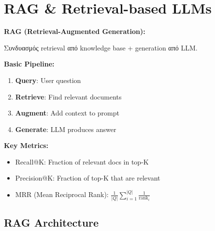 
\chapter{RAG \& Retrieval-based LLMs}

\begin{formulabox}
\textbf{RAG (Retrieval-Augmented Generation):}

Συνδυασμός retrieval από knowledge base + generation από LLM.

\textbf{Basic Pipeline:}
\begin{enumerate}
    \item \textbf{Query}: User question
    \item \textbf{Retrieve}: Find relevant documents
    \item \textbf{Augment}: Add context to prompt
    \item \textbf{Generate}: LLM produces answer
\end{enumerate}

\textbf{Key Metrics:}
\begin{itemize}
    \item Recall@K: Fraction of relevant docs in top-K
    \item Precision@K: Fraction of top-K that are relevant
    \item MRR (Mean Reciprocal Rank): $\frac{1}{|Q|}\sum_{i=1}^{|Q|} \frac{1}{\text{rank}_i}$
\end{itemize}
\end{formulabox}

\section{RAG Architecture}


